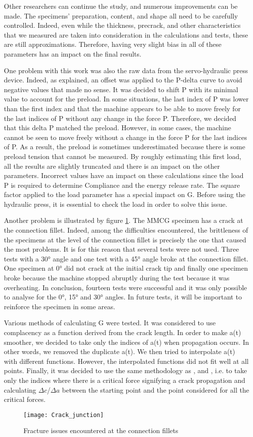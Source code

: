 Other researchers can continue the study, and numerous improvements can be made. The specimens' preparation, content, and shape all need to be carefully controlled. Indeed, even while the thickness, precrack, and other characteristics that we measured are taken into consideration in the calculations and tests, these are still approximations. Therefore, having very slight bias in all of these parameters has an impact on the final results.

One problem with this work was also the raw data from the servo-hydraulic press device. Indeed, as explained, an offset was applied to the P-delta curve to avoid negative values that made no sense. It was decided to shift P with its minimal value to account for the preload. In some situations, the last index of P was lower than the first index and that the machine appears to be able to move freely for the last indices of P without any change in the force P. Therefore, we decided that this delta P matched the preload. However, in some cases, the machine cannot be seen to move freely without a change in the force P for the last indices of P. As a result, the preload is sometimes underestimated because there is some preload tension that cannot be measured.
By roughly estimating this first load, all the results are slightly truncated and there is an impact on the other parameters. Incorrect values have an impact on these calculations since the load P is required to determine Compliance and the energy release rate. The square factor applied to the load parameter has a special impact on G. Before using the hydraulic press, it is essential to check the load in order to solve this issue. 

Another problem is illustrated by figure \ref{fig:Crack_junction}. The MMCG specimen has a crack at the connection fillet. Indeed, among the difficulties encountered, the brittleness of the specimens at the level of the connection fillet is precisely the one that caused the most problems. It is for this reason that several tests were not used. Three tests with a 30° angle and one test with a 45° angle broke at the connection fillet. One specimen at 0° did not crack at the initial crack tip and finally one specimen broke because the machine stopped abruptly during the test because it was overheating. In conclusion, fourteen tests were successful and it was only possible to analyse for the 0°, 15° and 30° angles. In future tests, it will be important to reinforce the specimen in some areas.

Various methods of calculating G were tested. It was considered to use complacency as a function derived from the crack length. In order to make a(t) smoother, we decided to take only the indices of a(t) when propagation occurs. In other words, we removed the duplicate a(t). We then tried to interpolate a(t) with different functions. However, the interpolated functions did not fit well at all points.
Finally, it was decided to use the same methodology as \cite{MoutouPitti2008}, \cite{Mambili2018} and  \cite{Odounga2018phd}, i.e. to take only the indices where there is a critical force signifying a crack propagation and calculating $\Delta c$/$\Delta a$ between the starting point and the point considered for all the critical forces.

\begin{figure}[htp]
	\centering
	\texttt{[image: Crack\_junction]}
	\caption{Fracture issues encountered at the connection fillets}
	\label{fig:Crack_junction}
\end{figure}